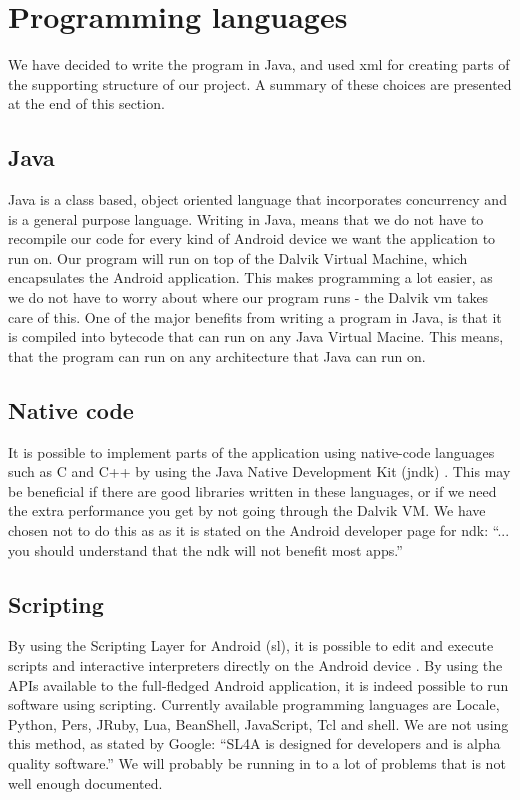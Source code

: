 \newpage

\section{Programming languages}\label{sec:proglan}
We have decided to write the program in Java, and used \gls{xml} for creating parts of the supporting structure of our project. A summary of these choices are presented at the end of this section.

\subsection{Java}

Java is a class based, object oriented language that incorporates concurrency and is a general purpose language. %
Writing in Java, means that we do not have to recompile our code for every kind of Android device we want the application to run on. Our program will run on top of the Dalvik Virtual Machine, which encapsulates the Android application. This makes programming a lot easier, as we do not have to worry about where our program runs - the Dalvik \gls{vm} takes care of this.
\newline
\newline
One of the major benefits from writing a program in Java, is that it is compiled into bytecode that can run on any Java Virtual Macine. This means, that the program can run on any architecture that Java can run on.

\subsection{Native code}
It is possible to implement parts of the application using native-code languages such as C and C++ by using the Java Native Development Kit (\gls{jndk}) \cite{bib:andk}. This may be beneficial if there are good libraries written in these languages, or if we need the extra performance you get by not going through the Dalvik VM. We have chosen not to do this as as it is stated on the Android developer page for \gls{ndk}: “... you should understand that the \gls{ndk} will not benefit most apps.”

\subsection{Scripting}
By using the Scripting Layer for Android (\gls{sl}), it is possible to edit and execute scripts and interactive interpreters directly on the Android device \cite{bib:slfa}. By using the APIs available to the full-fledged Android application, it is indeed possible to run software using scripting. Currently available programming languages are Locale, Python, Pers, JRuby, Lua, BeanShell, JavaScript, Tcl and shell. We are not using this method, as stated by Google: “SL4A is designed for developers and is alpha quality software.” We will probably be running in to a lot of problems that is not well enough documented.

